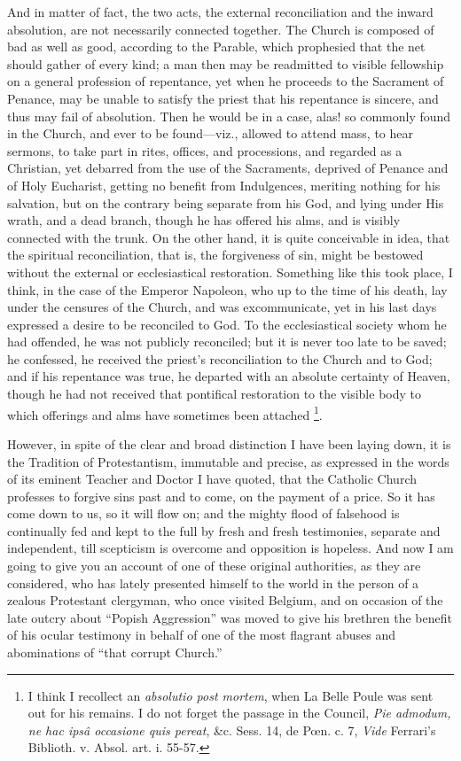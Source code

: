And in matter of fact, the two acts, the external
reconciliation and the inward absolution, are not
necessarily connected together. The Church is composed of
bad as well as good, according to the Parable, which
prophesied that the net should gather of every kind; a
man then may be readmitted to visible fellowship on a
general profession of repentance, yet when he proceeds to
the Sacrament of Penance, may be unable to satisfy the
priest that his repentance is sincere, and thus may fail
of absolution. Then he would be in a case, alas! so
commonly found in the Church, and ever to be
found—viz., allowed to attend mass, to hear sermons,
to take part in rites, offices, and processions, and
regarded as a Christian, yet debarred from the use of the
Sacraments, deprived of Penance and of Holy Eucharist,
getting no benefit from Indulgences, meriting nothing for
his salvation, but on the contrary being separate from
his God, and lying under His wrath, and a dead branch,
though he has offered his alms, and is visibly connected
with the trunk. On the other hand, it is quite
conceivable in idea, that the spiritual reconciliation,
that is, the forgiveness of sin, might be bestowed
without the external or ecclesiastical restoration.
Something like this took place, I think, in the case of
the Emperor Napoleon, who up to the time of his death,
lay under the censures of the Church, and was
excommunicate, yet in his last days expressed a desire to
be reconciled to God. To the ecclesiastical society whom
he had offended, he was not publicly reconciled; but it
is never too late to be saved; he confessed, he received
the priest's reconciliation to the Church and to God; and
if his repentance was true, he departed with an absolute
certainty of Heaven, though he had not received that
pontifical restoration to the visible body to which
offerings and alms have sometimes been attached \footnote{I think I recollect an \emph{absolutio
post mortem}, when La Belle Poule was sent out for
his remains. I do not forget the passage in the Council, \emph{Pie
admodum, ne hac ipsâ occasione quis pereat}, \&c.
Sess. 14, de Pœn. c. 7, \emph{Vide} Ferrari's
Biblioth. v. Absol. art. i. 55-57.}.

However, in spite of the clear and broad distinction I
have been laying down, it is the Tradition of
Protestantism, immutable and precise, as expressed in the
words of its eminent Teacher and Doctor I have quoted,
that the Catholic Church professes to forgive sins past
and to come, on the payment of a price. So it has come
down to us, so it will flow on; and the mighty flood of
falsehood is continually fed and kept to the full by
fresh and fresh testimonies, separate and independent,
till scepticism is overcome and opposition is hopeless.
And now I am going to give you an account of one of these
original authorities, as they are considered, who has
lately presented himself to the world in the person of a
zealous Protestant clergyman, who once visited Belgium,
and on occasion of the late outcry about ``Popish
Aggression'' was moved to give his brethren the
benefit of his ocular testimony in behalf of one of the
most flagrant abuses and abominations of ``that
corrupt Church.''

